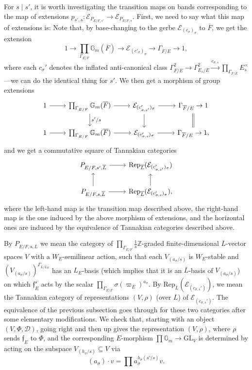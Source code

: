 \documentclass[11pt]{amsart}
\theoremstyle{definition}
\newcommand{\mc}{\mathcal}
\newcommand{\ov}{\overline}
\newcommand{\mf}{\mathfrak}
\begin{document}
For $s \mid s'$, it is worth investigating the transition maps on bands corresponding to the map of extensions $p_{s',s} \colon \mc{E}_{P_{E/F,s'}} \to \mc{E}_{P_{E/F,s}}$. First, we need to say what this map of extensions is: Note that, by base-changing to the gerbe $\mc{E}_{(c_{\sigma})_{\sigma}}$ to $\ov{F}$, we get the extension 
\begin{equation*} 1 \to \prod_{\Gamma_{E/F}} \mathbb{G}_{m}(\ov{F}) \to \mc{E}_{(c'_{\sigma})_{\sigma}} \to \Gamma_{\ov{F}/E} \to 1,
\end{equation*}
where each $c_{\sigma}'$ denotes the inflated anti-canonical class $\Gamma_{\ov{F}/E}^{2} \to \Gamma_{E_{s}/E}^{2} \xrightarrow{c_{\sigma,s}} \prod_{\Gamma_{\ov{F}/E}} E_{s}^{\times}$---we can do the identical thing for $s'$. We then get a morphism of group extensions 
\[
\begin{tikzcd}
1 \arrow{r} & \prod_{\Gamma_{E/F}} \mathbb{G}_{m}(\ov{F}) \arrow{r} \arrow["s'/s"]{d} & \mc{E}_{(c_{\sigma,s'}')_{\sigma}} \arrow{d} \arrow{r} & \Gamma_{\ov{F}/E} \arrow[equals]{d} \to 1 \\
1 \arrow{r} & \prod_{\Gamma_{E/F}} \mathbb{G}_{m}(\ov{F}) \arrow{r} & \mc{E}_{(c_{\sigma,s}')_{\sigma}} \arrow{r} & \Gamma_{\ov{F}/E} \to 1,
\end{tikzcd}
\]
and we get a commutative square of Tannakian categories 
\[
\begin{tikzcd}
P_{E/F,s',\ov{L}} \arrow{r} & \text{Rep}_{\ov{L}}(\mc{E}_{(c_{\sigma,s'}')_{\sigma}}) \\
P_{E/F,s,\ov{L}} \arrow{r} \arrow{u} & \text{Rep}_{\ov{L}}(\mc{E}_{(c_{\sigma,s}')_{\sigma}}), \arrow{u}
\end{tikzcd}
\]
where the left-hand map is the transition map described above, the right-hand map is the one induced by the above morphism of extensions, and the horizontal ones are induced by the equivalence of Tannakian categories described above. 

By $P_{E/F,s,\ov{L}}$ we mean the category of $\prod_{\Gamma_{E/F}} \frac{1}{s}\mathbb{Z}$-graded finite-dimensional $\ov{L}$-vector spaces $V$ with a $W_{E}$-semilinear action, such that each $V_{(a_{\sigma}/s)}$ is $W_{E}$-stable and $(V_{(a_{\sigma}/s)})^{\Gamma_{\ov{L}/L_{E}}}$ has an $L_{E}$-basis (which implies that it is an $\ov{L}$-basis of $V_{(a_{\sigma}/s)}$) on which $\mf{f}_{E}^{s}$ acts by the scalar $\prod_{\Gamma_{E/F}} \sigma(\varpi_{E})^{a_{\sigma}}$. By $\text{Rep}_{\ov{L}}(\mc{E}_{(c_{\sigma,s}')})$, we mean the Tannakian category of representations $(V, \rho)$ (over $\ov{L}$) of $\mc{E}_{(c_{\sigma,s}')}$. The equivalence of the previous subsection goes through for these two categories after some elementary modifications. We check that, starting with an object $(V, \Phi, \mc{D})$, going right and then up gives the representation $(V, \rho)$, where $\rho$ sends $\mf{f}_{E}$ to $\Phi$, and the corresponding $E$-morphism $\prod \mathbb{G}_{m} \to \mathrm{GL}_{V}$ is determined by acting on the subspace $V_{(h_{\sigma}/s)} \subseteq V$ via $$(a_{\sigma}) \cdot v = \prod a_{\sigma}^{h_{\sigma}(s'/s)}v.$$
\end{document}
